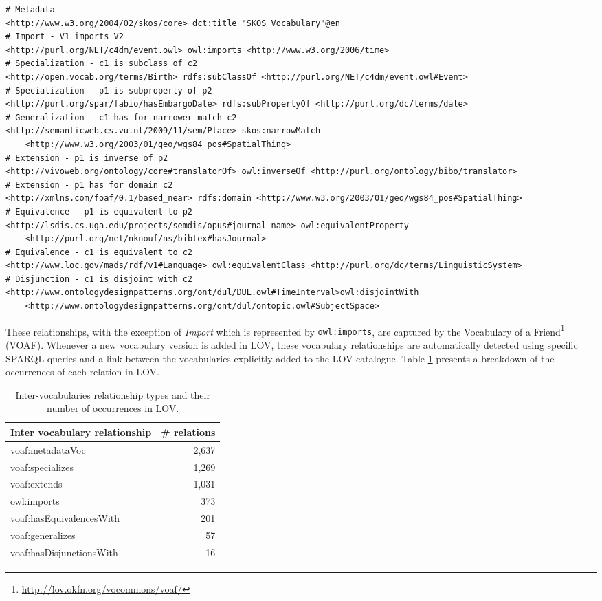 \documentclass{iosart2c}
\begin{document}
\begin{lstlisting}[float=*,basicstyle=\tiny,label={list:voaf}, language=turtle, caption={Examples of Inter-vocabulary relationships.}]
# Metadata
<http://www.w3.org/2004/02/skos/core> dct:title "SKOS Vocabulary"@en
# Import - V1 imports V2
<http://purl.org/NET/c4dm/event.owl> owl:imports <http://www.w3.org/2006/time>
# Specialization - c1 is subclass of c2
<http://open.vocab.org/terms/Birth> rdfs:subClassOf <http://purl.org/NET/c4dm/event.owl#Event>
# Specialization - p1 is subproperty of p2  
<http://purl.org/spar/fabio/hasEmbargoDate> rdfs:subPropertyOf <http://purl.org/dc/terms/date>
# Generalization - c1 has for narrower match c2 
<http://semanticweb.cs.vu.nl/2009/11/sem/Place> skos:narrowMatch 
    <http://www.w3.org/2003/01/geo/wgs84_pos#SpatialThing>
# Extension - p1 is inverse of p2
<http://vivoweb.org/ontology/core#translatorOf> owl:inverseOf <http://purl.org/ontology/bibo/translator>
# Extension - p1 has for domain c2
<http://xmlns.com/foaf/0.1/based_near> rdfs:domain <http://www.w3.org/2003/01/geo/wgs84_pos#SpatialThing>
# Equivalence - p1 is equivalent to p2
<http://lsdis.cs.uga.edu/projects/semdis/opus#journal_name> owl:equivalentProperty 
    <http://purl.org/net/nknouf/ns/bibtex#hasJournal>
# Equivalence - c1 is equivalent to c2 
<http://www.loc.gov/mads/rdf/v1#Language> owl:equivalentClass <http://purl.org/dc/terms/LinguisticSystem>
# Disjunction - c1 is disjoint with c2
<http://www.ontologydesignpatterns.org/ont/dul/DUL.owl#TimeInterval>owl:disjointWith 
    <http://www.ontologydesignpatterns.org/ont/dul/ontopic.owl#SubjectSpace>
\end{lstlisting}

These relationships, with the exception of \emph{Import} which is represented by {\small\texttt{owl:imports}}, are captured by the Vocabulary of a Friend\footnote{\url{http://lov.okfn.org/vocommons/voaf/}} (VOAF). Whenever a new vocabulary version is added in LOV, these vocabulary relationships are automatically detected using specific SPARQL queries and a link between the vocabularies explicitly added to the LOV catalogue. Table \ref{tab:voaf} presents a breakdown of the occurrences of each relation in LOV.

\begin{table}[h!tb]
\caption{Inter-vocabularies relationship types and their number of occurrences in LOV.}
\begin{tabular}{lr}
\hline
\textbf{Inter vocabulary relationship} & \textbf{\# relations} \\ \hline
voaf:metadataVoc & 2,637 \\
voaf:specializes & 1,269 \\
voaf:extends & 1,031 \\
owl:imports & 373 \\
voaf:hasEquivalencesWith & 201 \\
voaf:generalizes & 57 \\
voaf:hasDisjunctionsWith & 16 \\
\hline  
\end{tabular}
\label{tab:voaf}
\end{table}
\end{document}
